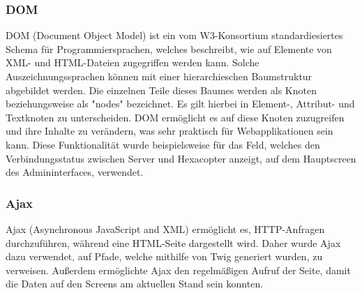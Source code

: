     \subsubsection{DOM}

{DOM\cite{dom}} (Document Object Model) ist ein vom W3-Konsortium standardiesiertes Schema für Programmiersprachen, welches beschreibt, wie auf Elemente von XML- und HTML-Dateien zugegriffen werden kann. Solche Auszeichnungssprachen können mit einer hierarchieschen Baumstruktur abgebildet werden. Die einzelnen Teile dieses Baumes werden als Knoten beziehungsweise als "nodes" bezeichnet.  Es gilt hierbei in Element-, Attribut- und Textknoten zu unterscheiden. DOM ermöglicht es auf diese Knoten zuzugreifen und ihre Inhalte zu verändern, was sehr praktisch für Webapplikationen sein kann. Diese Funktionalität wurde beispielsweise für das Feld, welches den Verbindungsstatus zwischen Server und Hexacopter anzeigt, auf dem Hauptscreen des Admininterfaces, verwendet.

    \subsubsection{Ajax}

{Ajax\cite{ajax}} (Asynchronous JavaScript and XML) ermöglicht es, HTTP-Anfragen durchzuführen, während eine HTML-Seite dargestellt wird. Daher wurde Ajax dazu verwendet, auf Pfade, welche mithilfe von Twig generiert wurden, zu verweisen. Außerdem ermöglichte Ajax den regelmäßigen Aufruf der Seite, damit die  Daten auf den Screens am aktuellen Stand sein konnten.

